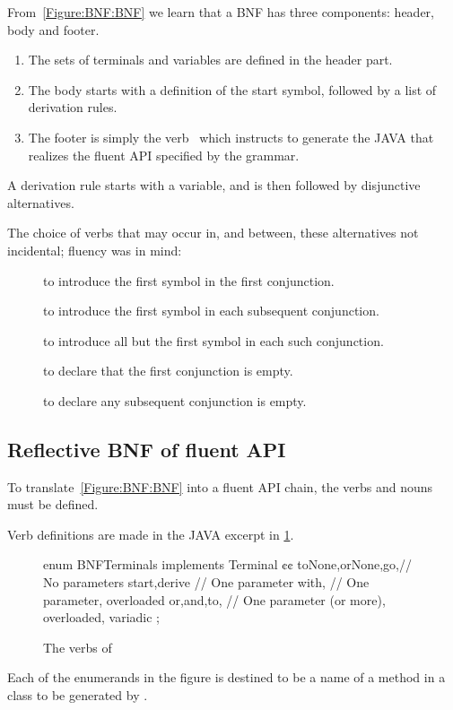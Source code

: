 From~\cref{Figure:BNF:BNF} we learn
  that a BNF has three components: header, body and footer.
  \begin{enumerate}
    \item The sets of terminals and variables are defined in the header part.
    \item The body starts with a definition of the start symbol, followed by a list of derivation
  rules.
\item The footer is simply the verb~ which instructs \Self
  to generate the JAVA that realizes the fluent API specified by the grammar.
  \end{enumerate}

A derivation rule starts with a variable, and is then followed by disjunctive alternatives.

The choice of verbs that may occur in, and between, these alternatives not incidental;
  fluency was in mind:
\begin{description}
  \item[] to introduce the first symbol in the first conjunction.
  \item[] to introduce the first symbol in each subsequent conjunction.
  \item[] to introduce all but the first symbol in each such conjunction.
  \item[] to declare that the first conjunction is empty.
  \item[] to declare any subsequent conjunction is empty.
\end{description}

\subsection{Reflective BNF of fluent API}

To translate~\cref{Figure:BNF:BNF} into a fluent
API chain, the verbs and nouns must be defined.

Verb definitions are made in the JAVA excerpt in
\cref{Figure:Verbs}.

\begin{figure}[htb]
  \begin{JAVA}[style=JAVA]
enum BNFTerminals implements Terminal {¢¢
  toNone,orNone,go,// No parameters
  start,derive     // One parameter
  with,            // One parameter, overloaded
  or,and,to,       // One parameter (or more), overloaded, variadic
  ;
}\end{JAVA}
  \caption{The verbs of \Self}
  \label{Figure:Verbs}
\end{figure}
Each of the enumerands in the figure is destined to be a
  name of a method in a class to be generated by \Self.

